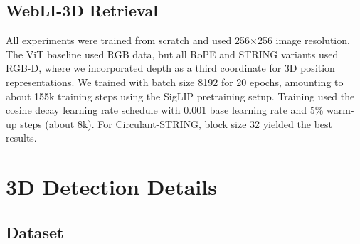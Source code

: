 \subsection{WebLI-3D Retrieval}
\label{app:retrieval}

All experiments were trained from scratch and used 256$\times$256 image resolution.  The ViT baseline used RGB data, but all RoPE and STRING variants used RGB-D, where we incorporated depth as a third coordinate for 3D position representations.  We trained with batch size 8192 for 20 epochs, amounting to about 155k training steps using the SigLIP \citep{zhai2023sigmoid} pretraining setup.  Training used the cosine decay learning rate schedule with 0.001 base learning rate and 5\% warm-up steps (about 8k).  For Circulant-STRING, block size 32 yielded the best results.

\section{3D Detection Details}
\label{app:owlvit3d}

\subsection{Dataset}
\label{app:owlvit3d_sim_data}

